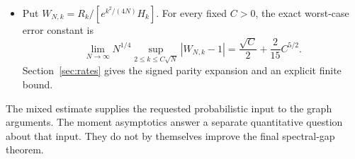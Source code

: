 \begin{itemize}
\[\]
uniformly throughout every sublinear upper range. Its first terms give sharp relative-accuracy thresholds $N^{1/2}$, $N^{3/5}$ and $N^{2/3}$. Theorem~\ref{thm:global} gives the approximation $\mathcal A_{N,k}$ at every order by keeping the denominator exact. Its optimal worst-case relative error is $C_*N^{-1/3}+o(N^{-1/3})$, where $C_*\approx0.39549627$. The full parity profile locates the largest error at odd orders near $1.1654N^{1/3}$.
\item Put $W_{N,k}=R_k/[e^{k^2/(4N)}H_k]$. For every fixed $C>0$, the exact worst-case error constant is
\[
\lim_{N\to\infty}N^{1/4}
\sup_{2\le k\le C\sqrt N}|W_{N,k}-1|
=\frac{\sqrt C}{2}+\frac{2}{15}C^{5/2}.
\]
Section~\ref{sec:rates} gives the signed parity expansion and an explicit finite bound.
\end{itemize}

The mixed estimate supplies the requested probabilistic input to the graph arguments. The moment asymptotics answer a separate quantitative question about that input. They do not by themselves improve the final spectral-gap theorem.
